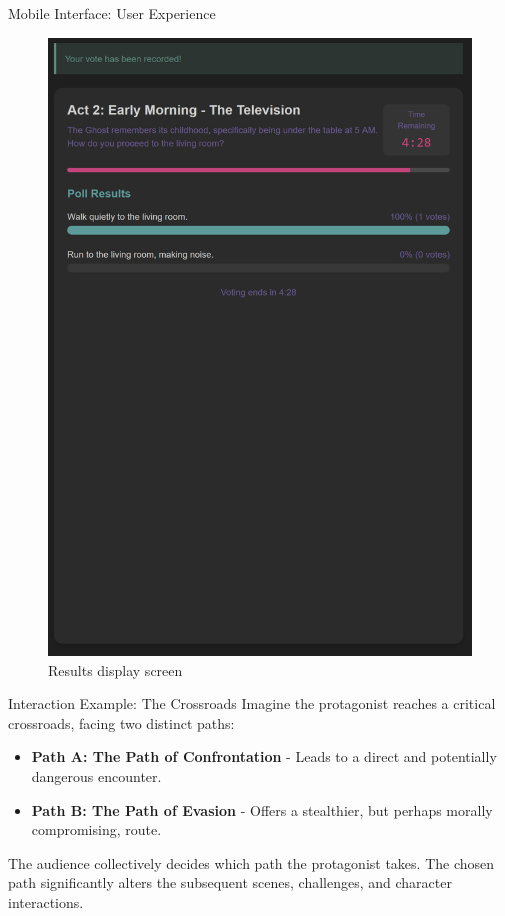 \documentclass[aspectratio=169]{beamer}
\begin{document}
\begin{frame}{Mobile Interface: User Experience}
\begin{figure}[h]
\begin{minipage}{0.45\textwidth}
            \includegraphics[height=0.7\textheight]{mobile_screen2.jpg}
            \caption{Results display screen}
        \end{minipage}
    \end{figure}
\end{frame}


\begin{frame}{Interaction Example: The Crossroads}
    Imagine the protagonist reaches a critical crossroads, facing two distinct paths:
    \begin{itemize}
        \item \textbf{Path A: The Path of Confrontation} - Leads to a direct and potentially dangerous encounter.
        \item \textbf{Path B: The Path of Evasion} - Offers a stealthier, but perhaps morally compromising, route.
    \end{itemize}
    The audience collectively decides which path the protagonist takes. The chosen path significantly alters the subsequent scenes, challenges, and character interactions.
\end{frame}
\end{document}
